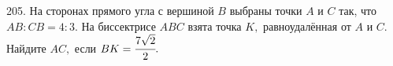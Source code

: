 205. На сторонах прямого угла с вершиной $B$ выбраны точки $A$ и $C$ так, что $AB : CB = 4 : 3.$ На
биссектрисе $ABC$ взята точка $K,$ равноудалённая от $A$ и $C.$ Найдите $AC,$ если $BK =\cfrac{7\sqrt{2}}{2}.$\\
